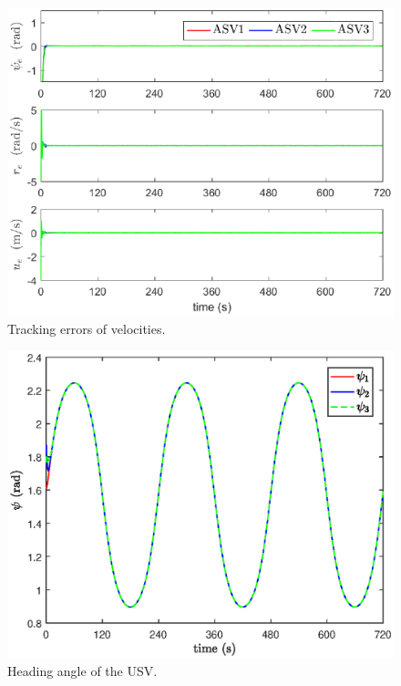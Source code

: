 \documentclass[a4paper,fleqn]{cas-dc}
\begin{document}
\begin{figure}[!htb]
	\centering
	\includegraphics[width=\hsize]{trackingError.eps}
	\caption{Tracking errors of velocities.}
	\label{fig7}
\end{figure}
\begin{figure}[!htb]
	\centering
	\includegraphics[width=\hsize]{headingAngle.eps}
	\caption{Heading angle of the USV.}
	\label{fig8}
\end{figure}
\end{document}
